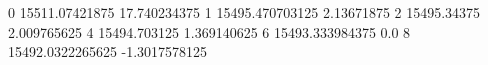 0 15511.07421875 17.740234375
1 15495.470703125 2.13671875
2 15495.34375 2.009765625
4 15494.703125 1.369140625
6 15493.333984375 0.0
8 15492.0322265625 -1.3017578125
